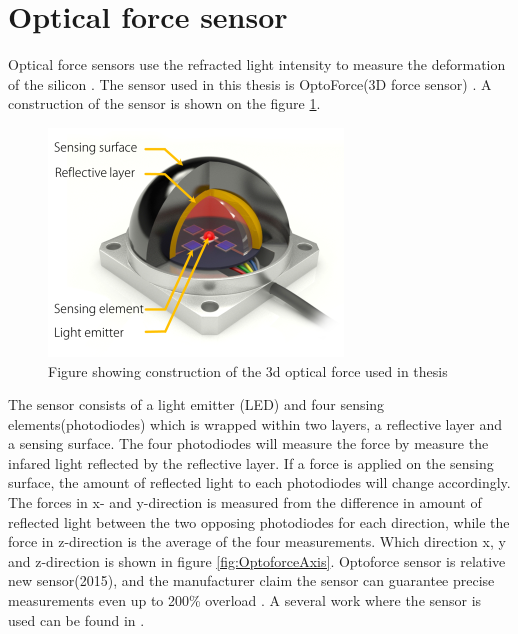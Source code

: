 \documentclass[USenglish]{ifimaster}  %
\begin{document}
\section{Optical force sensor}
Optical force sensors use the refracted light intensity to measure the deformation of the silicon \cite{6027100}\cite{6907805}. The sensor used in this thesis is OptoForce(3D force sensor) \cite{Optoforce}. A construction of the sensor is shown on the figure \ref{fig:OptoforceBuild}. 
\begin{figure}[h]
    \centering
    \includegraphics[scale=0.8]{Figures/OptoforceBuild}
    \caption{Figure showing construction of the 3d optical force used in thesis \cite{OptoforceFig}}
    \label{fig:OptoforceBuild}
\end{figure}
\FloatBarrier

The sensor consists of a light emitter (LED) and four sensing elements(photodiodes) which is wrapped within two layers, a reflective layer and a sensing surface. The four photodiodes will measure the force by measure the infared light reflected by the reflective layer. If a force is applied on the sensing surface, the amount of reflected light to each photodiodes will change accordingly. The forces in x- and y-direction is measured from the difference in amount of reflected light between the two opposing photodiodes for each direction, while the force in z-direction is the average of the four measurements. Which direction x, y and z-direction is shown in figure \ref{fig:OptoforceAxis}. Optoforce sensor is relative new sensor(2015), and the manufacturer claim the sensor can guarantee precise measurements even up to 200\% overload \cite{Optoforce2}. A several work where the sensor is used can be found in \cite{7803326,7759112,7849467}.
\end{document}
